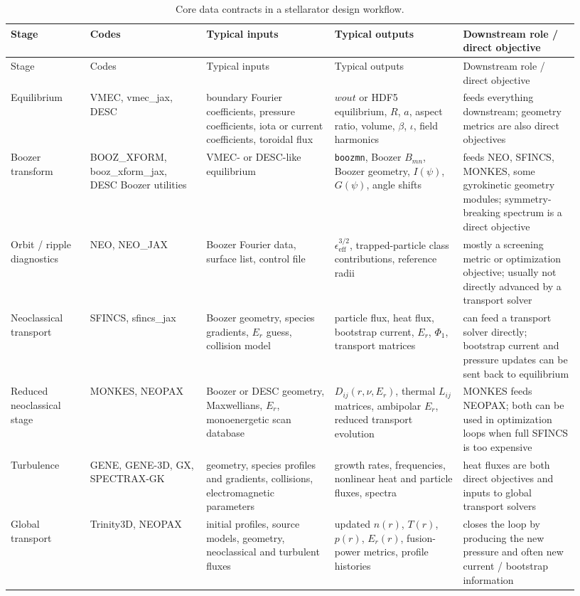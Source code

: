 \documentclass[11pt]{article}
\begin{document}
\begin{longtable}{p{0.13\linewidth}p{0.19\linewidth}p{0.21\linewidth}p{0.21\linewidth}p{0.19\linewidth}}
\caption{Core data contracts in a stellarator design workflow.}
\label{tab:contracts}\\
\toprule
Stage & Codes & Typical inputs & Typical outputs & Downstream role / direct objective \\
\midrule
\endfirsthead
\toprule
Stage & Codes & Typical inputs & Typical outputs & Downstream role / direct objective \\
\midrule
\endhead
Equilibrium &
VMEC, vmec\_jax, DESC &
boundary Fourier coefficients, pressure coefficients, iota or current coefficients, toroidal flux &
$wout$ or HDF5 equilibrium, $R$, $a$, aspect ratio, volume, $\beta$, $\iota$, field harmonics &
feeds everything downstream; geometry metrics are also direct objectives \\

Boozer transform &
BOOZ\_XFORM, booz\_xform\_jax, DESC Boozer utilities &
VMEC- or DESC-like equilibrium &
\texttt{boozmn}, Boozer $B_{mn}$, Boozer geometry, $I(\psi)$, $G(\psi)$, angle shifts &
feeds NEO, SFINCS, MONKES, some gyrokinetic geometry modules; symmetry-breaking spectrum is a direct objective \\

Orbit / ripple diagnostics &
NEO, NEO\_JAX &
Boozer Fourier data, surface list, control file &
$\epsilon_{\mathrm{eff}}^{3/2}$, trapped-particle class contributions, reference radii &
mostly a screening metric or optimization objective; usually not directly advanced by a transport solver \\

Neoclassical transport &
SFINCS, sfincs\_jax &
Boozer geometry, species gradients, $E_r$ guess, collision model &
particle flux, heat flux, bootstrap current, $E_r$, $\Phi_1$, transport matrices &
can feed a transport solver directly; bootstrap current and pressure updates can be sent back to equilibrium \\

Reduced neoclassical stage &
MONKES, NEOPAX &
Boozer or DESC geometry, Maxwellians, $E_r$, monoenergetic scan database &
$D_{ij}(r,\nu,E_r)$, thermal $L_{ij}$ matrices, ambipolar $E_r$, reduced transport evolution &
MONKES feeds NEOPAX; both can be used in optimization loops when full SFINCS is too expensive \\

Turbulence &
GENE, GENE-3D, GX, SPECTRAX-GK &
geometry, species profiles and gradients, collisions, electromagnetic parameters &
growth rates, frequencies, nonlinear heat and particle fluxes, spectra &
heat fluxes are both direct objectives and inputs to global transport solvers \\

Global transport &
Trinity3D, NEOPAX &
initial profiles, source models, geometry, neoclassical and turbulent fluxes &
updated $n(r)$, $T(r)$, $p(r)$, $E_r(r)$, fusion-power metrics, profile histories &
closes the loop by producing the new pressure and often new current / bootstrap information \\
\bottomrule
\end{longtable}
\end{document}
